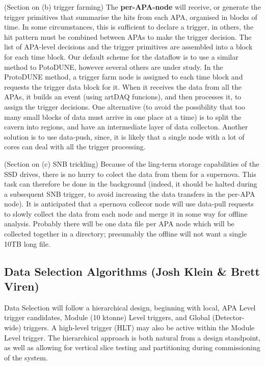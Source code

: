 (Section on (b) trigger farming) The {\bf per-APA-node} will receive,
or generate the trigger primitives that summarise the hits from each
APA, organised in blocks of time.  In some circumstances, this is
sufficient to declare a trigger, in others, the hit pattern must be
combined between APAs to make the trigger decision.  The list of
APA-level decisions and the trigger primitives are assembled into a
block for each time block.  Our default scheme for the dataflow is to
use a similar method to PotoDUNE, however several others are under
study.  In the ProtoDUNE method, a trigger farm node is assigned to
each time block and requests the trigger data block for it.  When it
receives the data from all the APAs, it builds an event (using artDAQ
funcions), and then processes it, to assign the trigger decisions.
One alternative (to avoid the possibility that too many small blocks
of data must arrive in one place at a time) is to split the cavern
into regions, and have an intermediate layer of data collecton.
Another solution is to use data-push, since, it is likely that a
single node with a lot of cores can deal with all the trigger
processing.

(Section on (c) SNB trickling) Because of the ling-term storage
capabilities of the SSD drives, there is no hurry to colect the data
from them for a supernova.  This task can therefore be done in the
background (indeed, it should be halted during a subsequent SNB
trigger, to avoid increasing the data transfers in the per-APA node).
It is anticipated that a spernova collecor node will use data-pull
requests to slowly collect the data from each node and merge it in
some way for offline analysis.  Probably there will be one data file
per APA node which will be collected together in a directory;
presumably the offline will not want a single 10TB long file.


\subsection{Data Selection Algorithms (Josh Klein \& Brett Viren)}
\label{sec:fdsp-daq-sel}


	Data Selection will follow a hierarchical design, beginning with local,
APA Level trigger candidates, Module (10 ktonne) Level triggers, and Global
(Detector-wide) triggers. A high-level trigger (HLT) may also be active within
the Module Level trigger.  The hierarchical approach is both natural from a
design standpoint, as well as allowing for vertical slice testing and
partitioning during commissioning of the system.

